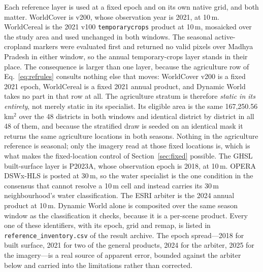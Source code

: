 \documentclass[conference]{IEEEtran}
\begin{document}
Each reference layer is used at a fixed epoch and on its own native grid, and both matter. WorldCover is v200, whose observation year is 2021, at 10\,m. WorldCereal is the 2021 v100 \texttt{temporarycrops} product at 10\,m, mosaicked over the study area and used unchanged in both windows. The seasonal active-cropland markers were evaluated first and returned no valid pixels over Madhya Pradesh in either window, so the annual temporary-crops layer stands in their place. The consequence is larger than one layer, because the agriculture row of Eq.~\eqref{eq:refrules} consults nothing else that moves: WorldCover v200 is a fixed 2021 epoch, WorldCereal is a fixed 2021 annual product, and Dynamic World takes no part in that row at all. The agriculture stratum is therefore \emph{static in its entirety}, not merely static in its specialist. Its eligible area is the same 167{,}250.56\,km$^2$ over the 48 districts in both windows and identical district by district in all 48 of them, and because the stratified draw is seeded on an identical mask it returns the same agriculture locations in both seasons. Nothing in the agriculture reference is seasonal; only the imagery read at those fixed locations is, which is what makes the fixed-location control of Section~\ref{sec:fixed} possible. The GHSL built-surface layer is P2023A, whose observation epoch is 2018, at 10\,m. OPERA DSWx-HLS is posted at 30\,m, so the water specialist is the one condition in the consensus that cannot resolve a 10\,m cell and instead carries its 30\,m neighbourhood's water classification. The ESRI arbiter is the 2024 annual product at 10\,m. Dynamic World alone is composited over the same season window as the classification it checks, because it is a per-scene product. Every one of these identifiers, with its epoch, grid and remap, is listed in \texttt{reference\_inventory.csv} of the result archive. The epoch spread---2018 for built surface, 2021 for two of the general products, 2024 for the arbiter, 2025 for the imagery---is a real source of apparent error, bounded against the arbiter below and carried into the limitations rather than corrected.
\end{document}

